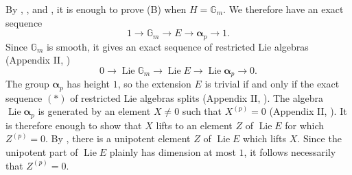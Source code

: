By , , and , it is enough to prove (B) when
\(H=\mathbb G_m\).  We therefore have an exact sequence
\[
  1\longrightarrow\mathbb G_m\longrightarrow E
    \longrightarrow\boldsymbol\alpha_p\longrightarrow1.
\]
Since \(\mathbb G_m\) is smooth, it gives an exact sequence of
restricted Lie algebras (Appendix II, )
\begin{equation}
  0\longrightarrow\operatorname{Lie}\mathbb G_m
    \longrightarrow\operatorname{Lie}E
    \longrightarrow\operatorname{Lie}\boldsymbol\alpha_p
    \longrightarrow0.
  \tag{*}\label{sga3:xvii:subsection:6-3:equation:star}
\end{equation}
The group \(\boldsymbol\alpha_p\) has height \(1\), so the
extension \(E\) is trivial if and only if the exact sequence
\((*)\) of restricted Lie algebras splits (Appendix II, ).
The algebra \(\operatorname{Lie}\boldsymbol\alpha_p\) is
generated by an element \(X\ne0\) such that \(X^{(p)}=0\)
(Appendix II, ).  It is therefore enough to show that \(X\)
lifts to an element \(Z\) of \(\operatorname{Lie}E\) for which
\(Z^{(p)}=0\).  By , there is a unipotent element \(Z\)
of \(\operatorname{Lie}E\) which lifts \(X\).  Since the unipotent
part of \(\operatorname{Lie}E\) plainly has dimension at most
\(1\), it follows necessarily that \(Z^{(p)}=0\).
